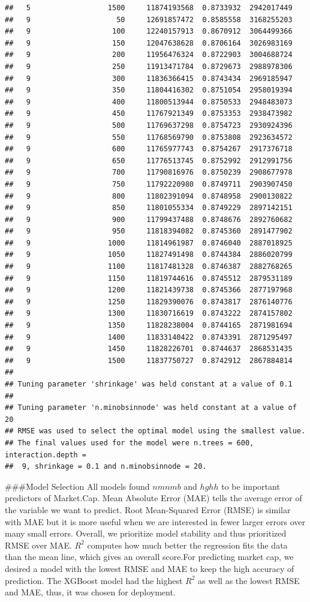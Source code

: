 \documentclass[11pt,]{article}
\begin{document}
\begin{verbatim}
##   5                  1500     11874193568  0.8733932  2942017449
##   9                    50     12691857472  0.8585558  3168255203
##   9                   100     12240157913  0.8670912  3064499366
##   9                   150     12047638628  0.8706164  3026983169
##   9                   200     11956476324  0.8722903  3004688724
##   9                   250     11913471784  0.8729673  2988978306
##   9                   300     11836366415  0.8743434  2969185947
##   9                   350     11804416302  0.8751054  2958019394
##   9                   400     11800513944  0.8750533  2948483073
##   9                   450     11767921349  0.8753353  2938473982
##   9                   500     11769637298  0.8754723  2930924396
##   9                   550     11768569790  0.8753808  2923634572
##   9                   600     11765977743  0.8754267  2917376718
##   9                   650     11776513745  0.8752992  2912991756
##   9                   700     11790816976  0.8750239  2908677978
##   9                   750     11792220980  0.8749711  2903907450
##   9                   800     11802391094  0.8748958  2900130822
##   9                   850     11801055334  0.8749229  2897142151
##   9                   900     11799437488  0.8748676  2892760682
##   9                   950     11818394082  0.8745360  2891477902
##   9                  1000     11814961987  0.8746040  2887018925
##   9                  1050     11827491498  0.8744384  2886020799
##   9                  1100     11817481328  0.8746387  2882768265
##   9                  1150     11819744616  0.8745512  2879531189
##   9                  1200     11821439738  0.8745366  2877197968
##   9                  1250     11829390076  0.8743817  2876140776
##   9                  1300     11830716619  0.8743222  2874157802
##   9                  1350     11828238004  0.8744165  2871981694
##   9                  1400     11833140422  0.8743391  2871295497
##   9                  1450     11828226701  0.8744637  2868531435
##   9                  1500     11837750727  0.8742912  2867884814
## 
## Tuning parameter 'shrinkage' was held constant at a value of 0.1
## 
## Tuning parameter 'n.minobsinnode' was held constant at a value of 20
## RMSE was used to select the optimal model using the smallest value.
## The final values used for the model were n.trees = 600, interaction.depth =
##  9, shrinkage = 0.1 and n.minobsinnode = 20.
\end{verbatim}

\#\#\#Model Selection All models found \(nmnmb\) and \(hghh\) to be
important predictors of Market.Cap. Mean Absolute Error (MAE) tells the
average error of the variable we want to predict. Root Mean-Squared
Error (RMSE) is similar with MAE but it is more useful when we are
interested in fewer larger errors over many small errors. Overall, we
prioritize model stability and thus prioritized RMSE over MAE. \(R^2\)
computes how much better the regression fits the data than the mean
line, which gives an overall score.For predicting market cap, we desired
a model with the lowest RMSE and MAE to keep the high accuracy of
prediction. The XGBoost model had the highest \(R^2\) as well as the
lowest RMSE and MAE, thus, it was chosen for deployment.
\end{document}
